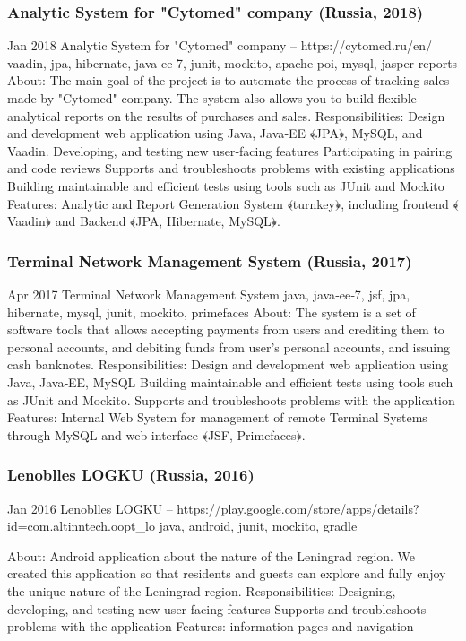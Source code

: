 \documentclass{vl}
\begin{document}
    \subsubsection{Analytic System for "Cytomed" company (Russia, 2018)}
    Jan 2018 Analytic System for "Cytomed" company – https://cytomed.ru/en/
    vaadin, jpa, hibernate, java‐ee‐7, junit, mockito, apache‐poi, mysql, jasper‐reports
    About: The main goal of the project is to automate the process of tracking sales made by "Cytomed" company. The system
    also allows you to build flexible analytical reports on the results of purchases and sales.
    Responsibilities:
    Design and development web application using Java, Java‐EE ﴾JPA﴿, MySQL, and Vaadin.
    Developing, and testing new user‐facing features
    Participating in pairing and code reviews
    Supports and troubleshoots problems with existing applications
    Building maintainable and efficient tests using tools such as JUnit and Mockito
    Features:
    Analytic and Report Generation System ﴾turnkey﴿, including frontend ﴾Vaadin﴿ and Backend ﴾JPA, Hibernate,
    MySQL﴿.

    \subsubsection{Terminal Network Management System (Russia, 2017)}
    Apr 2017 Terminal Network Management System
    java, java‐ee‐7, jsf, jpa, hibernate, mysql, junit, mockito, primefaces
    About: The system is a set of software tools that allows accepting payments from users and crediting them to personal
    accounts, and debiting funds from user's personal accounts, and issuing cash banknotes.
    Responsibilities:
    Design and development web application using Java, Java‐EE, MySQL
    Building maintainable and efficient tests using tools such as JUnit and Mockito.
    Supports and troubleshoots problems with the application
    Features:
    Internal Web System for management of remote Terminal Systems through MySQL and web interface ﴾JSF,
    Primefaces﴿.

    \subsubsection{Lenoblles LOGKU (Russia, 2016)}
    Jan 2016 Lenoblles LOGKU – https://play.google.com/store/apps/details?id=com.altinntech.oopt_lo
    java, android, junit, mockito, gradle

    About: Android application about the nature of the Leningrad region. We created this application so that residents and
    guests can explore and fully enjoy the unique nature of the Leningrad region.
    Responsibilities:
    Designing, developing, and testing new user‐facing features
    Supports and troubleshoots problems with the application
    Features:
    information pages and navigation
\end{document}
